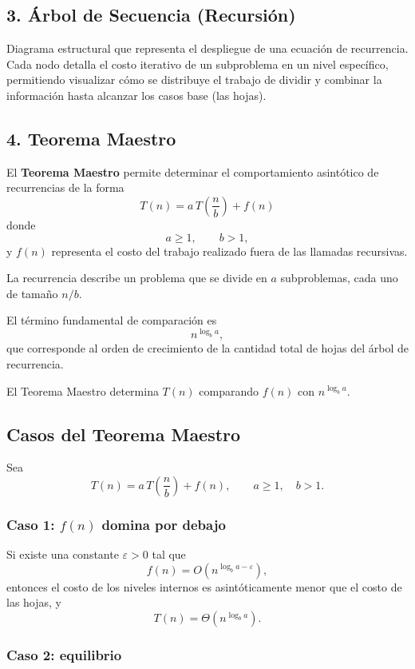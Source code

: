 \documentclass[12pt]{article}
\begin{document}
\subsection*{3. Árbol de Secuencia (Recursión)}
Diagrama estructural que representa el despliegue de una ecuación de recurrencia. Cada nodo detalla el costo iterativo de un subproblema en un nivel específico, permitiendo visualizar cómo se distribuye el trabajo de dividir y combinar la información hasta alcanzar los casos base (las hojas).

\subsection*{4. Teorema Maestro}
El \textbf{Teorema Maestro} permite determinar el comportamiento
asintótico de recurrencias de la forma
\[
\boxed{
T(n)=a\,T\!\left(\frac{n}{b}\right)+f(n)
}
\]
donde
\[
a\geq 1,\qquad b>1,
\]
y $f(n)$ representa el costo del trabajo realizado fuera de las
llamadas recursivas.

La recurrencia describe un problema que se divide en $a$ subproblemas,
cada uno de tamaño $n/b$.

El término fundamental de comparación es
\[
\boxed{
n^{\log_b a},
}
\]
que corresponde al orden de crecimiento de la cantidad total de hojas
del árbol de recurrencia.

El Teorema Maestro determina $T(n)$ comparando $f(n)$ con
$n^{\log_b a}$.

\subsection*{Casos del Teorema Maestro}

Sea
\[
T(n)=a\,T\!\left(\frac{n}{b}\right)+f(n),
\qquad a\geq 1,\quad b>1.
\]

\subsubsection*{Caso 1: $f(n)$ domina por debajo}

Si existe una constante $\varepsilon>0$ tal que
\[
\boxed{
f(n)=O\!\left(
n^{\log_b a-\varepsilon}
\right),
}
\]
entonces el costo de los niveles internos es asintóticamente menor
que el costo de las hojas, y
\[
\boxed{T(n)=\Theta\!\left(n^{\log_b a}\right).}
\]

\subsubsection*{Caso 2: equilibrio}
\end{document}

